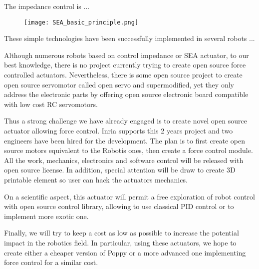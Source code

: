 The impedance control is ...

\begin{figure}[tb]
    \centering
        \texttt{[image: SEA\_basic\_principle.png]}
    \caption{}
    \label{fig:SEA-principle}
\end{figure}

These simple technologies have been successfully implemented in several robots ...


Although numerous robots based on control impedance or SEA actuator, to our best knowledge, there is no project currently trying to create open source force controlled actuators. Nevertheless, there is some open source project to create open source servomotor called open servo and supermodified, yet they only address the electronic parts by offering open source electronic board compatible with low cost RC servomotors.


Thus a strong challenge we have already engaged is to create novel open source actuator allowing force control. Inria supports this 2 years project and two engineers have been hired for the development. The plan is to first create open source motors equivalent to the Robotis ones, then create a force control module. All the work, mechanics, electronics and software control will be released with open source license. In addition, special attention will be draw to create 3D printable element so user can hack the actuators mechanics.

On a scientific aspect, this actuator will permit a free exploration of robot control with open source control library, allowing to use classical PID control or to implement more exotic one.

Finally, we will try to keep a cost as low as possible to increase the potential impact in the robotics field. In particular, using these actuators, we hope to create either a cheaper version of Poppy or a more advanced one implementing force control for a similar cost.
